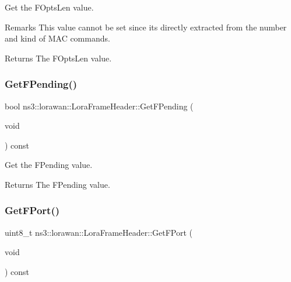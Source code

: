 Get the F\+Opts\+Len value.

\begin{DoxyRemark}{Remarks}
This value cannot be set since it\textquotesingle{}s directly extracted from the number and kind of M\+AC commands.
\end{DoxyRemark}
\begin{DoxyReturn}{Returns}
The F\+Opts\+Len value. 
\end{DoxyReturn}
\mbox{\label{classns3_1_1lorawan_1_1LoraFrameHeader_a425e56d3f473048ba6986bd1ac716e6c}} 
\subsubsection{\texorpdfstring{Get\+F\+Pending()}{GetFPending()}}
{\footnotesize\ttfamily bool ns3\+::lorawan\+::\+Lora\+Frame\+Header\+::\+Get\+F\+Pending (\begin{DoxyParamCaption}\item[{void}]{ }\end{DoxyParamCaption}) const}

Get the F\+Pending value.

\begin{DoxyReturn}{Returns}
The F\+Pending value. 
\end{DoxyReturn}
\mbox{\label{classns3_1_1lorawan_1_1LoraFrameHeader_ab859b1d3f527b8cb1b9f8b3e02b2c12d}} 
\subsubsection{\texorpdfstring{Get\+F\+Port()}{GetFPort()}}
{\footnotesize\ttfamily uint8\+\_\+t ns3\+::lorawan\+::\+Lora\+Frame\+Header\+::\+Get\+F\+Port (\begin{DoxyParamCaption}\item[{void}]{ }\end{DoxyParamCaption}) const}

